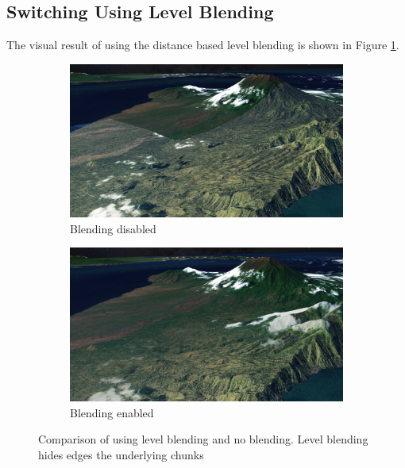 \subsection{Switching Using Level Blending}
\label{section:res_switching}
\FloatBarrier
The visual result of using the distance based level blending is shown in Figure \ref{fig:blending2}.
\begin{figure}[h]
    \centering
    \begin{subfigure}[bt]{0.48\textwidth}
        \includegraphics[width=\textwidth]{figures/results/blending/blending_bali2_disabled.jpg}
        \caption{Blending disabled}
    \end{subfigure}
    \begin{subfigure}[bt]{0.48\textwidth}
        \includegraphics[width=\textwidth]{figures/results/blending/blending_bali2_enabled.jpg}
        \caption{Blending enabled}
    \end{subfigure}
    \caption{Comparison of using level blending and no blending. Level blending hides edges the underlying chunks}
    \label{fig:blending2}
\end{figure}

